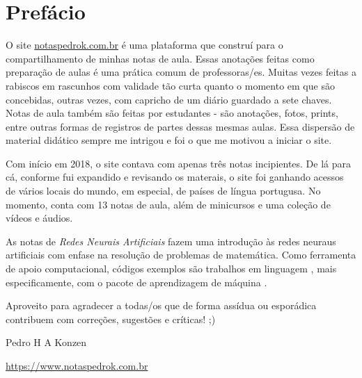 

\chapter*{Prefácio}\label{prefacio}

O site \href{https://www.notaspedrok.com.br}{notaspedrok.com.br} é uma plataforma que construí para o compartilhamento de minhas notas de aula. Essas anotações feitas como preparação de aulas é uma prática comum de professoras/es. Muitas vezes feitas a rabiscos em rascunhos com validade tão curta quanto o momento em que são concebidas, outras vezes, com capricho de um diário guardado a sete chaves. Notas de aula também são feitas por estudantes - são anotações, fotos, prints, entre outras formas de registros de partes dessas mesmas aulas. Essa dispersão de material didático sempre me intrigou e foi o que me motivou a iniciar o site.

Com início em 2018, o site contava com apenas três notas incipientes. De lá para cá, conforme fui expandido e revisando os materais, o site foi ganhando acessos de vários locais do mundo, em especial, de países de língua portugusa. No momento, conta com 13 notas de aula, além de minicursos e uma coleção de vídeos e áudios.

As notas de \emph{Redes Neurais Artificiais} fazem uma introdução às redes neuraus artificiais com enfase na resolução de problemas de matemática. Como ferramenta de apoio computacional, códigos exemplos são trabalhos em linguagem {\python}, mais especificamente, com o pacote de aprendizagem de máquina {\pytorch}.

Aproveito para agradecer a todas/os que de forma assídua ou esporádica contribuem com correções, sugestões e críticas! ;)

\begin{flushright}
  Pedro H A Konzen

  \url{https://www.notaspedrok.com.br}
\end{flushright}

